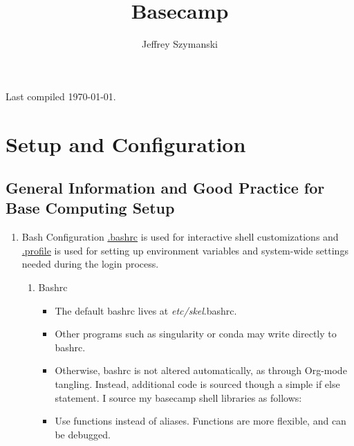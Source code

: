 \documentclass{article}
\author{Jeffrey Szymanski}
\date{}
\title{Basecamp}
\begin{document}
\maketitle
\tableofcontents

\vspace{5mm}
\hfill Last compiled \today.


\section{Setup and Configuration}
\label{sec:org8c53850}
\subsection{General Information and Good Practice for Base Computing Setup}
\label{sec:org299f903}
\begin{enumerate}
\item Bash Configuration
\label{sec:org7539944}
\href{file:///home/jeszyman/.bashrc}{.bashrc} is used for interactive shell customizations and \href{file:///home/jeszyman/.profile}{.profile} is used for setting up environment variables and system-wide settings needed during the login process.\\[0pt]
\begin{enumerate}
\item Bashrc
\label{sec:org50b7e9d}
\begin{itemize}
\item The default bashrc lives at \emph{etc/skel}.bashrc.\\[0pt]
\item Other programs such as singularity or conda may write directly to bashrc.\\[0pt]
\item Otherwise, bashrc is not altered automatically, as through Org-mode tangling. Instead, additional code is sourced though a simple if else statement. I source my basecamp shell libraries as follows:\\[0pt]

\item Use functions instead of aliases. Functions are more flexible, and can be debugged.\\[0pt]
\end{itemize}
\end{enumerate}
\end{enumerate}
\end{document}

